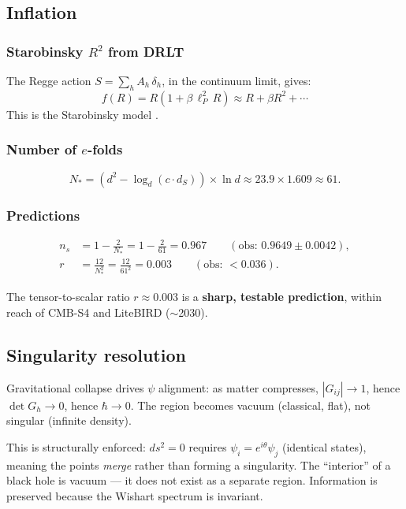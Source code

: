 \documentclass[12pt]{article}
\theoremstyle{remark}
\theoremstyle{definition}
\begin{document}
\subsection{Inflation}

\subsubsection{Starobinsky $R^2$ from DRLT}

The Regge action $S = \sum_h A_h\,\delta_h$, in the continuum limit, gives:
\begin{equation}
f(R) = R(1 + \beta\,\ell_P^2\,R) \approx R + \beta R^2 + \cdots
\end{equation}
This is the Starobinsky model \cite{Starobinsky}.

\subsubsection{Number of $e$-folds}

\begin{equation}
N_* = (d^2 - \log_d(c \cdot d_S)) \times \ln d \approx 23.9 \times 1.609 \approx 61.
\end{equation}

\subsubsection{Predictions}
\begin{align}
n_s &= 1 - \frac{2}{N_*} = 1 - \frac{2}{61} = 0.967 \qquad (\text{obs: } 0.9649 \pm 0.0042), \\
r &= \frac{12}{N_*^2} = \frac{12}{61^2} = 0.003 \qquad (\text{obs: } < 0.036).
\end{align}

The tensor-to-scalar ratio $r \approx 0.003$ is a \textbf{sharp, testable prediction}, within reach of CMB-S4 and LiteBIRD ($\sim$2030).

\subsection{Singularity resolution}

Gravitational collapse drives $\psi$ alignment: as matter compresses, $|G_{ij}| \to 1$, hence $\det G_h \to 0$, hence $\hbar \to 0$. The region becomes vacuum (classical, flat), not singular (infinite density).

This is structurally enforced: $ds^2 = 0$ requires $\psi_i = e^{i\theta}\psi_j$ (identical states), meaning the points \emph{merge} rather than forming a singularity. The ``interior'' of a black hole is vacuum --- it does not exist as a separate region. Information is preserved because the Wishart spectrum is invariant.
\end{document}

